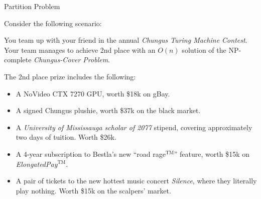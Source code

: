 \documentclass{beamer}
\begin{document}
\begin{frame}{Partition Problem}

Consider the following scenario:

\vspace{2mm} \pause

You team up with your friend in the annual \textit{Chungus Turing Machine Contest}. Your team manages to achieve 2nd place with an $O(n)$ solution of the NP-complete \textit{Chungus-Cover Problem}.

\vspace{2mm} \pause

The 2nd place prize includes the following: \pause
\begin{itemize}
    \item A NoVideo CTX 7270 GPU, worth \$18k on gBay. \pause
    \item A signed Chungus plushie, worth \$37k on the black market. \pause
    \item A \textit{University of Mississauga scholar of 2077} stipend, covering approximately two days of tuition. Worth \$26k. \pause
    \item A 4-year subscription to Bestla's new ``road rage$^{\text{TM}}$'' feature, worth \$15k on \textit{ElongatedPay}$^{\text{TM}}$. \pause
    \item A pair of tickets to the new hottest music concert \textit{Silence}, where they literally play nothing. Worth \$15k on the scalpers' market.
\end{itemize}

\end{frame}
\end{document}
